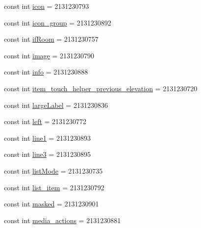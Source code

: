 \begin{DoxyCompactItemize}
\item 
const int \mbox{\hyperlink{class_f_w_p_s___app_1_1_droid_1_1_resource_1_1_id_aed0b6a8e1aa009e0711e8d7738703c1d}{icon}} = 2131230793
\item 
const int \mbox{\hyperlink{class_f_w_p_s___app_1_1_droid_1_1_resource_1_1_id_aaece3d9cd2a26e966255d0600cb99144}{icon\+\_\+group}} = 2131230892
\item 
const int \mbox{\hyperlink{class_f_w_p_s___app_1_1_droid_1_1_resource_1_1_id_a58685d3101f5f065e6c87edb1a2a5722}{if\+Room}} = 2131230757
\item 
const int \mbox{\hyperlink{class_f_w_p_s___app_1_1_droid_1_1_resource_1_1_id_af7e90b501f6c650e2f1fc9fa899c1a0b}{image}} = 2131230790
\item 
const int \mbox{\hyperlink{class_f_w_p_s___app_1_1_droid_1_1_resource_1_1_id_a0226bd1060f400bda00889e10fe67f98}{info}} = 2131230888
\item 
const int \mbox{\hyperlink{class_f_w_p_s___app_1_1_droid_1_1_resource_1_1_id_a065b78b5b316871c0fec786456a3107e}{item\+\_\+touch\+\_\+helper\+\_\+previous\+\_\+elevation}} = 2131230720
\item 
const int \mbox{\hyperlink{class_f_w_p_s___app_1_1_droid_1_1_resource_1_1_id_a13796a258ce55557d505021c29755fac}{large\+Label}} = 2131230836
\item 
const int \mbox{\hyperlink{class_f_w_p_s___app_1_1_droid_1_1_resource_1_1_id_a09555077f119e0307652c64ad500e935}{left}} = 2131230772
\item 
const int \mbox{\hyperlink{class_f_w_p_s___app_1_1_droid_1_1_resource_1_1_id_aac8abf6c6d6042082567e24cad36f036}{line1}} = 2131230893
\item 
const int \mbox{\hyperlink{class_f_w_p_s___app_1_1_droid_1_1_resource_1_1_id_a319e1da6c6f0d3b505cc28786b95d5fa}{line3}} = 2131230895
\item 
const int \mbox{\hyperlink{class_f_w_p_s___app_1_1_droid_1_1_resource_1_1_id_aebe918c50cdc09581953097d83e9b502}{list\+Mode}} = 2131230735
\item 
const int \mbox{\hyperlink{class_f_w_p_s___app_1_1_droid_1_1_resource_1_1_id_a63458ef07688b3b3ac44c28e6653562f}{list\+\_\+item}} = 2131230792
\item 
const int \mbox{\hyperlink{class_f_w_p_s___app_1_1_droid_1_1_resource_1_1_id_abaff38ee4cb63f19ec42a609f02c6317}{masked}} = 2131230901
\item 
const int \mbox{\hyperlink{class_f_w_p_s___app_1_1_droid_1_1_resource_1_1_id_a25d0f7e1cc85f9c3eb6f29c46737e087}{media\+\_\+actions}} = 2131230881

\end{DoxyCompactItemize}
